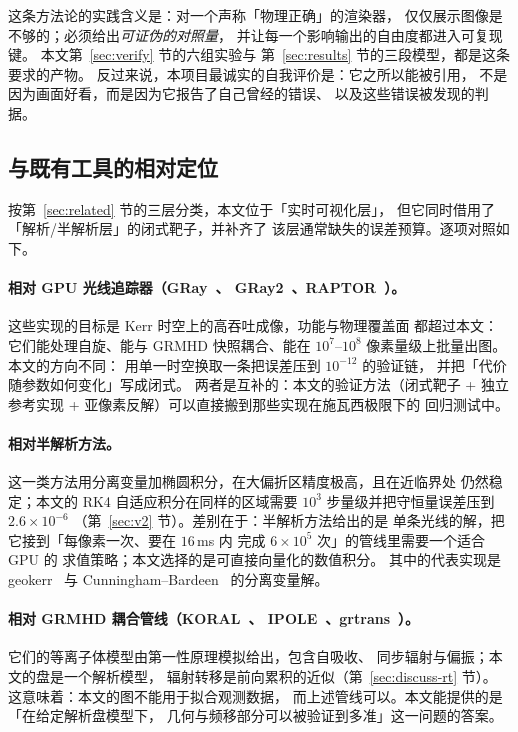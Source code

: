 这条方法论的实践含义是：对一个声称「物理正确」的渲染器，
仅仅展示图像是不够的；必须给出\emph{可证伪的对照量}，
并让每一个影响输出的自由度都进入可复现键。
本文第~\ref{sec:verify} 节的六组实验与
第~\ref{sec:results} 节的三段模型，都是这条要求的产物。
反过来说，本项目最诚实的自我评价是：它之所以能被引用，
不是因为画面好看，而是因为它报告了自己曾经的错误、
以及这些错误被发现的判据。

\subsection{与既有工具的相对定位}\label{sec:discuss-related}

按第~\ref{sec:related} 节的三层分类，本文位于「实时可视化层」，
但它同时借用了「解析/半解析层」的闭式靶子，并补齐了
该层通常缺失的误差预算。逐项对照如下。

\paragraph{相对 GPU 光线追踪器（GRay~\cite{gray2013}、
GRay2~\cite{gray2}、RAPTOR~\cite{raptor2019}）。}
这些实现的目标是 Kerr 时空上的高吞吐成像，功能与物理覆盖面
都超过本文：它们能处理自旋、能与 GRMHD 快照耦合、能在
$10^7$--$10^8$ 像素量级上批量出图。本文的方向不同：
用单一时空换取一条把误差压到 $10^{-12}$ 的验证链，
并把「代价随参数如何变化」写成闭式。
两者是互补的：本文的验证方法（闭式靶子 + 独立参考实现 +
亚像素反解）可以直接搬到那些实现在施瓦西极限下的
回归测试中。

\paragraph{相对半解析方法。}
这一类方法用分离变量加椭圆积分，在大偏折区精度极高，且在近临界处
仍然稳定；本文的 RK4 自适应积分在同样的区域需要
$10^3$ 步量级并把守恒量误差压到 $2.6\times10^{-6}$
（第~\ref{sec:v2} 节）。差别在于：半解析方法给出的是
单条光线的解，把它接到「每像素一次、要在 $16$\,ms 内
完成 $6\times10^5$ 次」的管线里需要一个适合 GPU 的
求值策略；本文选择的是可直接向量化的数值积分。
其中的代表实现是 geokerr~\cite{dexter2009} 与
Cunningham--Bardeen~\cite{cunningham1973} 的分离变量解。

\paragraph{相对 GRMHD 耦合管线（KORAL~\cite{koral2013}、
IPOLE~\cite{ipole2016}、grtrans~\cite{grtrans2016}）。}
它们的等离子体模型由第一性原理模拟给出，包含自吸收、
同步辐射与偏振；本文的盘是一个解析模型，
辐射转移是前向累积的近似（第~\ref{sec:discuss-rt} 节）。
这意味着：本文的图不能用于拟合观测数据，
而上述管线可以。本文能提供的是「在给定解析盘模型下，
几何与频移部分可以被验证到多准」这一问题的答案。

